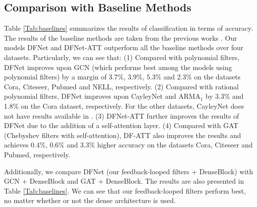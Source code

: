 \documentclass{article}
\begin{document}
\subsection{Comparison with Baseline Methods}
Table \ref{Tab:baselines} summarizes the results of classification in terms of accuracy. The results of the baseline methods are taken from the previous works  \cite{kipf2016semi, liao2019lanczosnet, velivckovic2017graph, yang2016revisiting}. Our models DFNet and DFNet-ATT outperform all the baseline methods over four datasets. Particularly, we can see that: (1) Compared with polynomial filters, DFNet improves upon GCN (which performs best among the models using polynomial filters) by a margin of 3.7\%, 3.9\%, 5.3\% and 2.3\% on the datasets Cora, Citeseer, Pubmed and NELL, respectively. (2) Compared with rational polynomial filters, DFNet improves upon CayleyNet and ARMA$_1$ by 3.3\% and 1.8\% on the Cora dataset, respectively. For the other datasets, CayleyNet does not have results available in \cite{levie2017cayleynets}. (3) DFNet-ATT further improves the results of DFNet due to the addition of a self-attention layer. (4) Compared with GAT (Chebyshev filters with self-attention), DF-ATT also improves the results and achieves 0.4\%, 0.6\% and 3.3\% higher accuracy on the datasets Cora, Citeseer and Pubmed, respectively.

Additionally, we compare DFNet (our feedback-looped filters + DenseBlock) with GCN + DenseBlock and GAT + DenseBlock. The results are also presented in Table \ref{Tab:baselines}. We can see that our feedback-looped filters perform best, no matter whether or not the dense architecture is used. 
\end{document}
